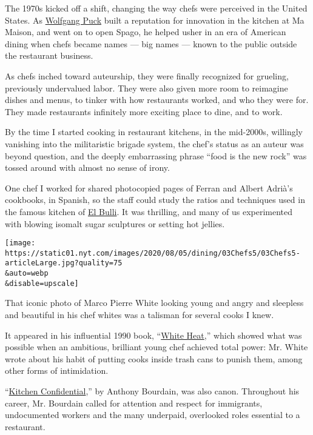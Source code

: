 The 1970s kicked off a shift, changing the way chefs were perceived in
the United States. As
\href{https://www.nytimes.com/2012/10/31/dining/wolfgang-puck-the-original-celebrity-chef-is-still-keeping-busy.html}{Wolfgang
Puck} built a reputation for innovation in the kitchen at Ma Maison, and
went on to open Spago, he helped usher in an era of American dining when
chefs became names --- big names --- known to the public outside the
restaurant business.

As chefs inched toward auteurship, they were finally recognized for
grueling, previously undervalued labor. They were also given more room
to reimagine dishes and menus, to tinker with how restaurants worked,
and who they were for. They made restaurants infinitely more exciting
place to dine, and to work.

By the time I started cooking in restaurant kitchens, in the mid-2000s,
willingly vanishing into the militaristic brigade system, the chef's
status as an auteur was beyond question, and the deeply embarrassing
phrase ``food is the new rock'' was tossed around with almost no sense
of irony.

One chef I worked for shared photocopied pages of Ferran and Albert
Adrià's cookbooks, in Spanish, so the staff could study the ratios and
techniques used in the famous kitchen of
\href{https://www.nytimes.com/2010/09/22/dining/reviews/22pour.html}{El
Bulli}. It was thrilling, and many of us experimented with blowing
isomalt sugar sculptures or setting hot jellies.

\texttt{[image: https://static01.nyt.com/images/2020/08/05/dining/03Chefs5/03Chefs5-articleLarge.jpg?quality=75\\\&auto=webp\\\&disable=upscale]}

That iconic photo of Marco Pierre White looking young and angry and
sleepless and beautiful in his chef whites was a talisman for several
cooks I knew.

It appeared in his influential 1990 book,
``\href{https://www.nytimes.com/2015/04/08/dining/marco-pierre-white-white-heat-a-game-changer-revisited.html}{White
Heat},'' which showed what was possible when an ambitious, brilliant
young chef achieved total power: Mr. White wrote about his habit of
putting cooks inside trash cans to punish them, among other forms of
intimidation.

``\href{https://www.harpercollins.com/products/kitchen-confidential-updated-ed-anthony-bourdain}{Kitchen
Confidential},'' by Anthony Bourdain, was also canon. Throughout his
career, Mr. Bourdain called for attention and respect for immigrants,
undocumented workers and the many underpaid, overlooked roles essential
to a restaurant.

